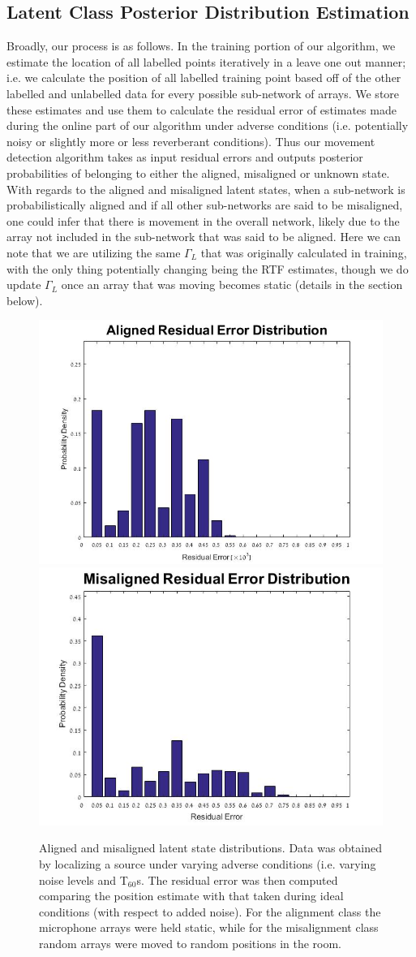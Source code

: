 \documentclass{article}
\begin{document}
\subsection{Latent Class Posterior Distribution Estimation}
Broadly, our process is as follows. In the training portion of our algorithm, we estimate the location of all labelled points iteratively in a leave one out manner; i.e. we calculate the position of all labelled training point based off of the other labelled and unlabelled data for every possible sub-network of arrays. We store these estimates and use them to calculate the residual error of estimates made during the online part of our algorithm under adverse conditions (i.e. potentially noisy or slightly more or less reverberant conditions). Thus our movement detection algorithm takes as input residual errors and outputs posterior probabilities of belonging to either the aligned, misaligned or unknown state. With regards to the aligned and misaligned latent states, when a sub-network is probabilistically aligned and if all other sub-networks are said to be misaligned, one could infer that there is movement in the overall network, likely due to the array not included in the sub-network that was said to be aligned. Here we can note that we are utilizing the same \textbf{$\Gamma_L$} that was originally calculated in training, with the only thing potentially changing being the RTF estimates, though we do update \textbf{$\Gamma_L$} once an array that was moving becomes static (details in the section below).

\begin{figure}[htbp]
\centering
\includegraphics[width=0.48\linewidth]{figures/resError_align.jpg}
\includegraphics[width=0.45\linewidth]{figures/resError_misalign.jpg}
\caption{Aligned and misaligned latent state distributions. Data was obtained by localizing a source under varying adverse conditions (i.e. varying noise levels and T$_{60}$s. The residual error was then computed comparing the position estimate with that taken during ideal conditions (with respect to added noise). For the alignment class the microphone arrays were held static, while for the misalignment class random arrays were moved to random positions in the room.}
\label{fig:class_distributions}
\end{figure}
\end{document}
